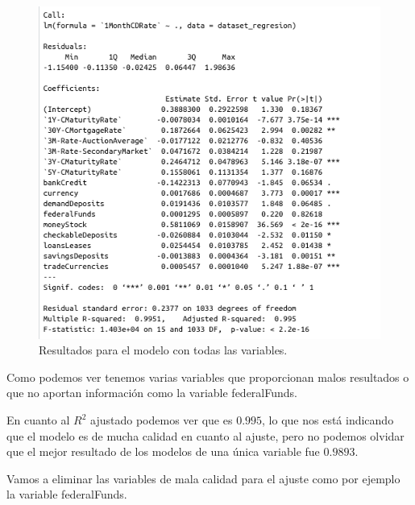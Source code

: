 \documentclass[12pt,a4paper]{article}
\begin{document}
\begin{figure}[H]
	\centering 
	\includegraphics[scale=0.65]{./Imagenes/Regresion/regresion_multiple1.png}
	\caption{Resultados para el modelo con todas las variables.}
\end{figure}

Como podemos ver tenemos varias variables que proporcionan malos resultados o que no aportan información como la variable federalFunds.

En cuanto al $R^2$ ajustado podemos ver que es $0.995$, lo que nos está indicando que el modelo es de mucha calidad en cuanto al ajuste, pero no podemos olvidar que el mejor resultado de los modelos de una única variable fue $0.9893$.

Vamos a eliminar las variables de mala calidad para el ajuste como por ejemplo la variable federalFunds.
\end{document}
